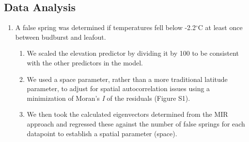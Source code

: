\documentclass{article}\usepackage[]{graphicx}\usepackage[]{color}
\begin{document}
\subsection*{Data Analysis}
\begin{enumerate}
\item A false spring was determined if temperatures fell below -2.2$^{\circ}$C at least once between budburst and leafout.
\begin{enumerate}
\item We scaled the elevation predictor by dividing it by 100 to be consistent with the other predictors in the model.
\item We used a space parameter, rather than a more traditional latitude parameter, to adjust for spatial autocorrelation issues using a minimization of Moran's \textit{I} of the residuals \citep{Baumen2017} (Figure S1).
\item We then took the calculated eigenvectors determined from the MIR approach and regressed these against the number of false springs for each datapoint to establish a spatial parameter (space). %
\end{enumerate}


\end{enumerate}
\end{document}
